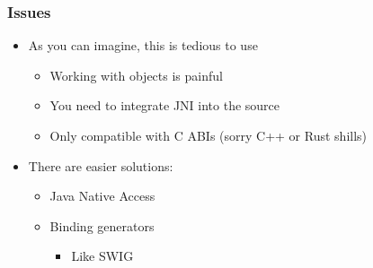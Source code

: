 \documentclass[10pt,mathserif]{beamer}
\begin{document}
	\begin{frame}
		\frametitle{Issues}

		\begin{itemize}
			\item As you can imagine, this is tedious to use
			\begin{itemize}
				\item Working with objects is painful
				\item You need to integrate JNI into the source
				\item Only compatible with C ABIs (sorry C++ or Rust shills)
			\end{itemize}
			\item There are easier solutions:
			\begin{itemize}
				\item Java Native Access
				\item Binding generators
				\begin{itemize}
					\item Like SWIG
				\end{itemize}
			\end{itemize}
		\end{itemize}
	\end{frame}



\end{document}
